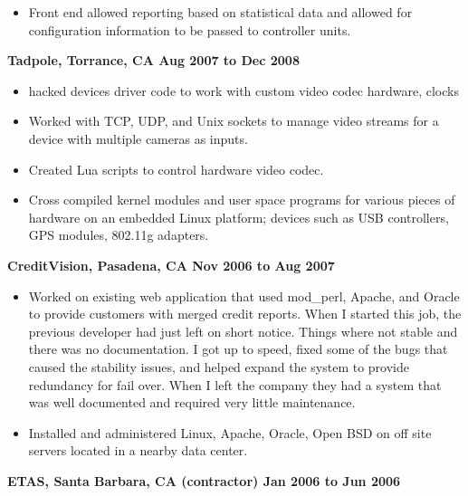 \documentclass{res}
\begin{document}
\begin{resume}
\begin{itemize}
\item
	Front end allowed reporting based on statistical data and allowed
	for configuration information to be passed to controller units.

\end{itemize}

{\large \bf Tadpole, Torrance, CA \hfill Aug 2007 to Dec 2008}

\begin{itemize}

\item
	hacked devices driver code to work with custom video codec
	hardware, clocks
\item
	Worked with TCP, UDP, and Unix sockets to manage video streams
	for a device with multiple cameras as inputs.

\item
	Created Lua scripts to control hardware video codec.

\item
	Cross compiled kernel modules and user space programs for various
	pieces of hardware on an embedded Linux platform; devices such
	as USB controllers, GPS modules, 802.11g adapters.

\end{itemize}

{\large \bf CreditVision, Pasadena, CA \hfill Nov 2006 to Aug 2007}

\begin{itemize}

\item
	Worked on existing web application that used mod\_perl, Apache,
	and Oracle to provide customers with merged credit reports.
	When I started this job, the previous developer had just
	left on short notice.  Things where not stable and there was
	no documentation.  I got up to speed, fixed some of the bugs
	that caused the stability issues, and helped expand the system
	to provide redundancy for fail over.  When I left the company
	they had a system that was well documented and required very
	little maintenance.

\item
	Installed and administered Linux, Apache, Oracle, Open BSD on
	off site servers located in a nearby data center.
\end{itemize}

{\large \bf ETAS, Santa Barbara, CA (contractor) \hfill Jan 2006 to
Jun 2006}

\begin{itemize}


\end{itemize}
\end{resume}
\end{document}
